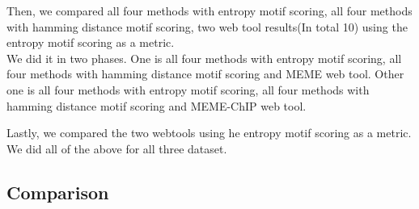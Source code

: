 \documentclass{article}
\begin{document}
Then, we compared all four methods with entropy motif scoring, all four methods with hamming distance motif scoring, two web tool results(In total 10) using the entropy motif scoring as a metric.\\
We did it in two phases. One is all four methods with entropy motif scoring, all four methods with hamming distance motif scoring and MEME web tool. Other one is all four methods with entropy motif scoring, all four methods with hamming distance motif scoring and MEME-ChIP web tool.

Lastly, we compared the two webtools using he entropy motif scoring as a metric.\\

We did all of the above for all three dataset.

\subsection{Comparison}
\end{document}
